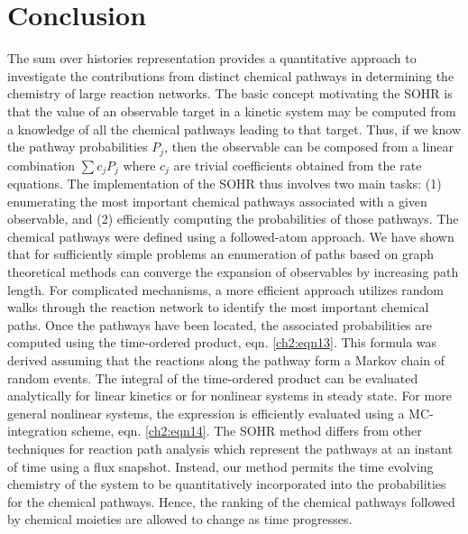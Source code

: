 \chapter{Conclusion}
\label{chapter5}
The sum over histories representation provides a quantitative approach to investigate
the contributions from distinct chemical pathways in determining the chemistry of large
reaction networks. The basic concept motivating the SOHR is that the value of an
observable target in a kinetic system may be computed from a knowledge of all the
chemical pathways leading to that target. Thus, if we know the pathway probabilities
$P_j$, then the observable can be composed from a linear combination $\sum{c_jP_j}$ where $c_j$ are
trivial coefficients obtained from the rate equations. The implementation of the SOHR
thus involves two main tasks: (1) enumerating the most important chemical pathways
associated with a given observable, and (2) efficiently computing the probabilities of
those pathways. The chemical pathways were defined using a followed-atom approach.
We have shown that for sufficiently simple problems an enumeration of paths based on
graph theoretical methods can converge the expansion of observables by increasing
path length. For complicated mechanisms, a more efficient approach utilizes random
walks through the reaction network to identify the most important chemical paths. Once
the pathways have been located, the associated probabilities are computed using the
time-ordered product, eqn. \ref{ch2:eqn13}. This formula was derived assuming that the
reactions along the pathway form a Markov chain of random events. The integral of
the time-ordered product can be evaluated analytically for linear kinetics or for nonlinear
systems in steady state. For more general nonlinear systems, the expression is efficiently
evaluated using a MC-integration scheme, eqn. \ref{ch2:eqn14}. The SOHR method
differs from other techniques for reaction path analysis which represent the pathways at
an instant of time using a flux snapshot.\cite{ch3_17_kee2008chemkin} Instead, our method permits the time
evolving chemistry of the system to be quantitatively incorporated into the probabilities
for the chemical pathways. Hence, the ranking of the chemical pathways followed by
chemical moieties are allowed to change as time progresses.
\newline
